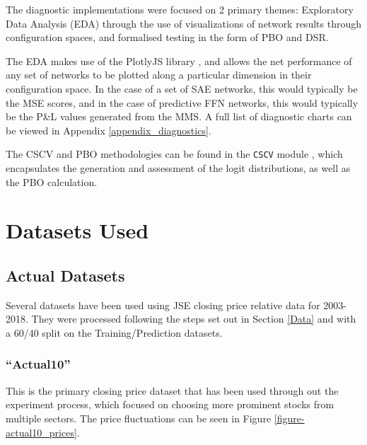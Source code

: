 \documentclass[a4paper,11pt,oneside]{article}
\theoremstyle{plain}
\theoremstyle{definition}
\begin{document}
	The diagnostic implementations were focused on 2 primary themes: Exploratory Data Analysis (EDA) through the use of visualizations of network results through configuration spaces, and formalised testing in the form of PBO and DSR.
	
	The EDA makes use of the PlotlyJS library \citep{PlotlyJS}, and allows the net performance of any set of networks to be plotted along a particular dimension in their configuration space. In the case of a set of SAE networks, this would typically be the MSE scores, and in the case of predictive FFN networks, this would typically be the P\&L values generated from the MMS. A full list of diagnostic charts can be viewed in Appendix \ref{appendix_diagnostics}. \newline
	
	The CSCV and PBO methodologies can be found in the \texttt{CSCV} module \citep{DCCSCV}, which encapsulates the generation and assessment of the logit distributions, as well as the PBO calculation.
	
	
	\newpage
	\section{Datasets Used}\label{Datasets}
	
	\subsection{Actual Datasets}
	
	Several datasets have been used using JSE closing price relative data for 2003-2018. They were processed following the steps set out in Section \ref{Data} and with a 60/40 split on the Training/Prediction datasets.
	
	\subsubsection{``Actual10''}\label{dataset_actual10}
	
	This is the primary closing price dataset that has been used through out the experiment process, which focused on choosing more prominent stocks from multiple sectors. The price fluctuations can be seen in Figure \ref{figure-actual10_prices}.
	
\end{document}

